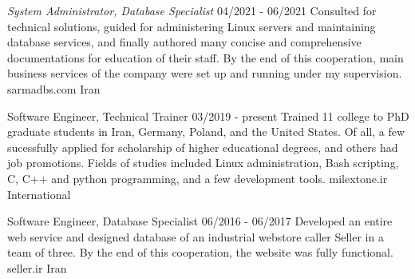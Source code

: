 \documentclass[a4paper,12pt]{memoir} %
\begin{document}

{\textit{System Administrator, Database Specialist}}
{04/2021 - 06/2021}
{Consulted for technical solutions, guided for
administering Linux servers and maintaining database
services, and finally authored many concise and
comprehensive documentations for education of their
staff.
By the end of this cooperation, main business
services of the company were set up and running
under my supervision.}
{sarmadbs.com}
{Iran}


{Software Engineer, Technical Trainer}
{03/2019 - present}
{Trained 11 college to PhD graduate students in
Iran, Germany, Poland, and the United States.
Of all, a few sucessfully applied for scholarship
of higher educational degrees, and others had job
promotions.
Fields of studies included Linux administration,
Bash scripting, C, C++ and python programming,
and a few development tools.}
{milextone.ir}
{International}


{Software Engineer, Database Specialist}
{06/2016 - 06/2017}
{Developed an entire web service and designed database
of an industrial webstore caller Seller in a team of three.
By the end of this cooperation, the website was fully functional.}
{seller.ir}
{Iran}


\Sep %


\clearpage %

\userinformation %

\framebreak %

\end{document}
